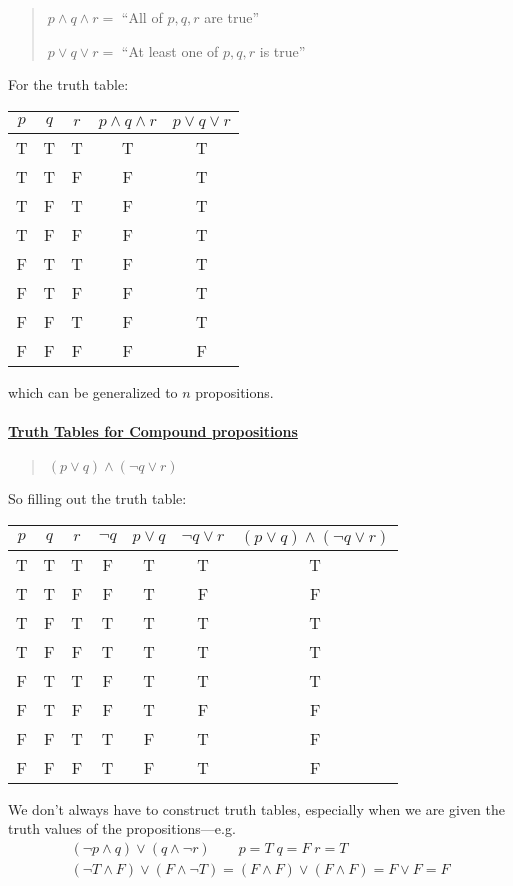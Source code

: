 \documentclass[../main.tex]{subfiles}
\begin{document}
\begin{quote}
    $p \land q \land r =$ ``All of $p, q, r$ are true''

    $p \lor q \lor r =$ ``At least one of $p, q, r$ is true''
\end{quote}

For the truth table:
\begin{table}[ht]
    \centering
    \begin{tabular}{c|c|c|c|c}
        $p$ & $q$ & $r$ & $p \land q \land r$ & $p \lor q \lor r$ \\
        \hline
        T & T & T & T & T \\
        T & T & F & F & T \\
        T & F & T & F & T \\
        T & F & F & F & T \\
        F & T & T & F & T \\
        F & T & F & F & T \\
        F & F & T & F & T \\
        F & F & F & F & F
    \end{tabular}
\end{table}

which can be generalized to $n$ propositions.

\paragraph{\underline{Truth Tables for Compound propositions}}

\begin{quote}
    $(p \lor q) \land (\neg q \lor r)$
\end{quote}

So filling out the truth table:
\begin{table}[ht]
    \centering
    \begin{tabular}{c|c|c|c|c|c|c}
        $p$ & $q$ & $r$ & $\neg q$ & $p \lor q$ & $\neg q \lor r$ & $(p \lor q) \land (\neg q \lor r)$ \\
        \hline
        T & T & T & F & T & T & T \\
        T & T & F & F & T & F & F \\
        T & F & T & T & T & T & T \\
        T & F & F & T & T & T & T \\
        F & T & T & F & T & T & T \\
        F & T & F & F & T & F & F \\
        F & F & T & T & F & T & F \\
        F & F & F & T & F & T & F
    \end{tabular}
\end{table}

We don't always have to construct truth tables, especially when we are given the truth values of the
propositions---e.g.
\begin{align*}
    (\neg p \land q) \lor (q \land \neg r) \qquad p = T \; q = F \; r = T \\
    (\neg T \land F) \lor (F \land \neg T) = (F \land F) \lor (F \land F) = F \lor F = F
\end{align*}
\end{document}
